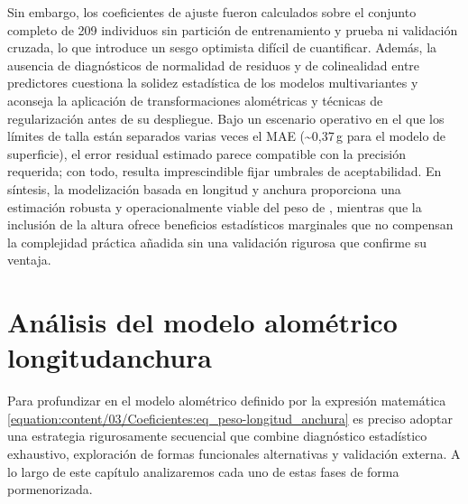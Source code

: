 \documentclass[a4paper,10pt,spanish]{jupyterBook}
\begin{document}
\sphinxAtStartPar
Sin embargo, los coeficientes de ajuste fueron calculados sobre el conjunto completo de 209 individuos sin partición de entrenamiento y prueba ni validación cruzada, lo que introduce un sesgo optimista difícil de cuantificar. Además, la ausencia de diagnósticos de normalidad de residuos y de colinealidad entre predictores cuestiona la solidez estadística de los modelos multivariantes y aconseja la aplicación de transformaciones alométricas y técnicas de regularización antes de su despliegue. Bajo un escenario operativo en el que los límites de talla están separados varias veces el MAE (\textasciitilde{}0,37 g para el modelo de superficie), el error residual estimado parece compatible con la precisión requerida; con todo, resulta imprescindible fijar umbrales de aceptabilidad. En síntesis, la modelización basada en longitud y anchura proporciona una estimación robusta y operacionalmente viable del peso de , mientras que la inclusión de la altura ofrece beneficios estadísticos marginales que no compensan la complejidad práctica añadida sin una validación rigurosa que confirme su ventaja.

\sphinxstepscope


\section{Análisis del modelo alométrico longitud\sphinxhyphen{}anchura}
\label{\detokenize{content/03/Analisis:analisis-del-modelo-alometrico-longitud-anchura}}\label{\detokenize{content/03/Analisis::doc}}
\sphinxAtStartPar
Para profundizar en el modelo alométrico definido por la expresión matemática \eqref{equation:content/03/Coeficientes:eq_peso-longitud_anchura} es preciso adoptar una estrategia rigurosamente secuencial que combine diagnóstico estadístico exhaustivo, exploración de formas funcionales alternativas y validación externa. A lo largo de este capítulo analizaremos cada uno de estas fases de forma pormenorizada.
\end{document}
